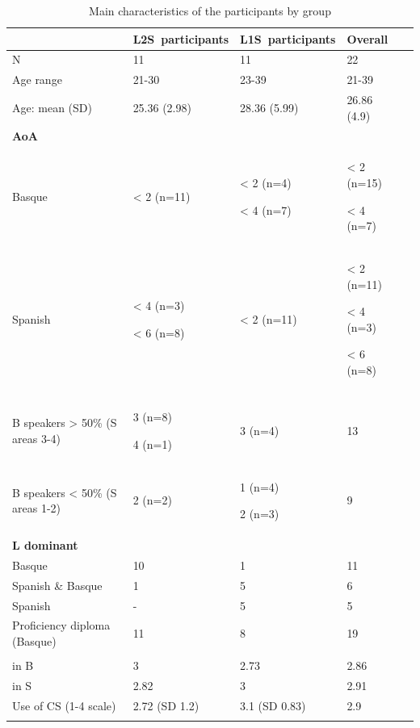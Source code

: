 \documentclass[output=paper]{langscibook}
\begin{document}
\begin{table}
\begin{tabularx}{\textwidth}{l@{}YYR{1.7cm}@{}c@{}}
\lsptoprule
  & \mbox{L2S participants} & \mbox{L1S participants} & Overall&\\
\midrule
N   & 11 & 11 & 22\\
Age range  & 21-30 & 23-39 & 21-39\\
Age: mean (SD)  & 25.36 (2.98) & 28.36 (5.99) & 26.86 (4.9)\\
\tablevspace
\textbf{AoA}\\
\midrule
Basque & < 2 (n=11) & < 2 (n=4)

                            < 4 (n=7) & < 2 (n=15)

                                        < 4 (n=7)\\
\tablevspace
Spanish & < 4 (n=3)

            < 6 (n=8) & < 2 (n=11) & < 2 (n=11)

                                        < 4 (n=3)

                                        < 6 (n=8)\\

\tablevspace
{}\\
\midrule
B speakers > 50\%  (S areas 3-4) & 3 (n=8)

                                                                4 (n=1) & 3 (n=4) & 13\\
\tablevspace
B speakers < 50\% (S areas 1-2) & 2 (n=2) & 1 (n=4)

                                                2 (n=3) & 9\\
\tablevspace
\textbf{L dominant}\\
\midrule
Basque & 10 & 1 & 11\\
Spanish \& Basque & 1 & 5 & 6\\
Spanish & {}- & 5 & 5\\
\tablevspace
Proficiency diploma (Basque)  & 11 & 8 & 19\\
\tablevspace
{}\\
\midrule
in B & 3 & 2.73 & 2.86\\
in S & 2.82 & 3 & 2.91\\
\tablevspace
Use of CS (1-4 scale) & 2.72 (SD 1.2) & 3.1 (SD 0.83) & 2.9\\
\lspbottomrule
\end{tabularx}
\caption{Main characteristics of the participants by group}
\label{tab:ezeiza:2}
\end{table}
\end{document}
